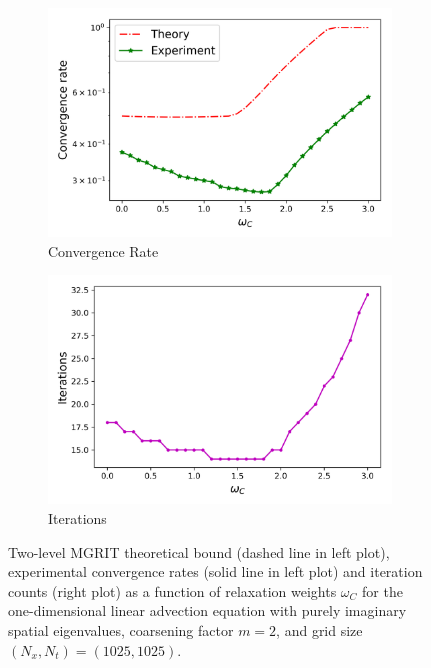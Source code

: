\documentclass[VANCOUVER,STIX1COL]{WileyNJD-v2}
\begin{document}
\begin{figure}[h!]
    \centering
    \begin{subfigure}[b]{0.4\textwidth}
    \includegraphics[width=\textwidth]{images/advcC_conv.png}
    \caption{\normalsize Convergence Rate}
    \end{subfigure}
     \begin{subfigure}[b]{0.4\textwidth}
    \includegraphics[width=\textwidth]{images/advcC_iter.png}
    \caption{\normalsize Iterations}
    \end{subfigure}
    \caption{Two-level MGRIT theoretical bound (dashed line in left plot), experimental convergence rates (solid line in left plot) and iteration counts  (right plot) as a function of relaxation weights $\omega_C$ for the one-dimensional linear advection equation with purely imaginary spatial eigenvalues, coarsening factor $m = 2$, and grid size $(N_x, N_t) = (1025, 1025)$.}
    \label{fig:AdvcC new theoretical bound}
\end{figure}
%
\end{document}
